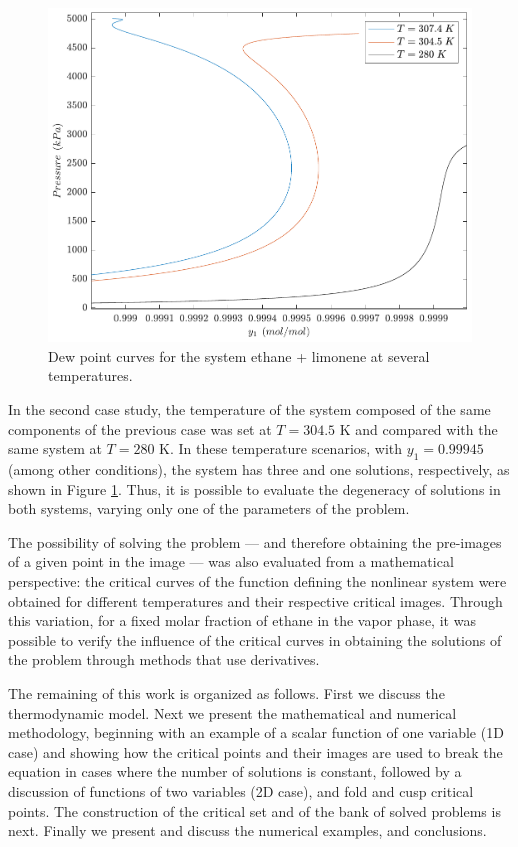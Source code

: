 \documentclass[journal=iecred,manuscript=article]{achemso}
\theoremstyle{definition}
\theoremstyle{remark}
\begin{document}
\begin{figure}
	\begin{center}
		\includegraphics[scale=0.50]{curvas_ponto_orvalho.pdf}
		\caption{Dew point curves for the system ethane + limonene at several temperatures.}\label{fig:dew_point_curve}
	\end{center}
\end{figure}

In the second case study,  the temperature of the system 
composed of the same components of the previous case was set at  $ T = 304.5 $ K and compared 
 with the same system at $T = 280$ K. In these temperature
 scenarios, with $ y_1 = 0.99945 $ (among other conditions), the system has
  three and one solutions, respectively, as shown in Figure \ref{fig:dew_point_curve}. Thus, it is
   possible to evaluate the degeneracy of solutions in both systems, varying only one of the parameters of the problem.

The possibility of solving the problem --- and therefore obtaining the pre-images of a given point in the image --- was also evaluated from a mathematical perspective: the critical curves 
of the function defining  the nonlinear
 system were obtained for different temperatures and their respective critical images. Through this variation, for a 
 fixed molar fraction of ethane in the vapor phase, it was possible to verify the influence of the critical curves in obtaining the solutions of the problem through methods that use derivatives.

 The remaining of this work is organized as follows. First we
 discuss the thermodynamic model. Next we 
 present the mathematical 
 and numerical methodology, beginning with an example of 
 a scalar function of one variable (1D case) and 
 showing how the critical points and their images are used
 to break the equation in cases where the number of 
 solutions is constant, followed by  a discussion of functions
 of two variables (2D case),
  and fold and cusp critical points. The 
 construction of the critical set and 
 of the bank of solved problems is next. Finally we present
 and discuss 
 the numerical examples, and conclusions.
\end{document}
